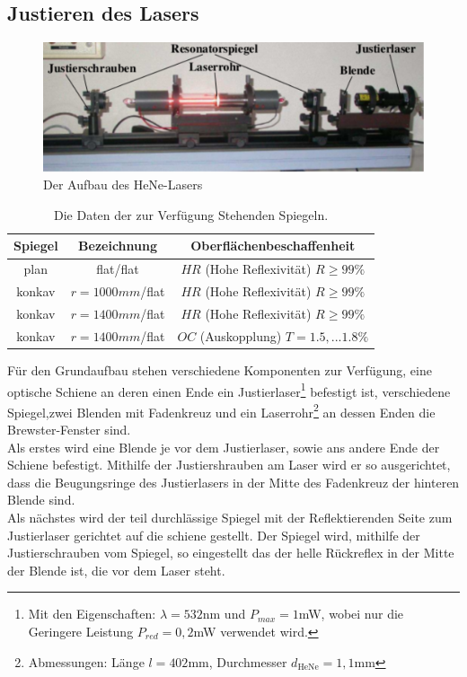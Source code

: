 \subsection{Justieren des Lasers}
\begin{figure}[h!]
\centering
\includegraphics[scale=0.75]{../Grafiken/Aufbau.pdf}
\caption{Der Aufbau des HeNe-Lasers\cite{V61}}\label{Aufbau}
\end{figure}
\begin{table}[h!]
\centering
\begin{tabular}{c c c}
Spiegel & Bezeichnung & Oberflächenbeschaffenheit \\\hline
plan & flat/flat & $HR$ (Hohe Reflexivität) $R\ge 99\%$\\
konkav & $r=1000mm$/flat & $HR$ (Hohe Reflexivität) $R\ge 99\%$\\
konkav & $r=1400mm$/flat & $HR$ (Hohe Reflexivität) $R\ge 99\%$\\
konkav & $r=1400mm$/flat & $OC$ (Auskopplung) $T=1.5,...1.8\% $
\end{tabular}
\caption{Die Daten der zur Verfügung Stehenden Spiegeln.\cite{V61}\label{Eigenschaften}}
\end{table}
Für den Grundaufbau stehen verschiedene Komponenten zur Verfügung, eine optische Schiene an deren einen Ende ein Justierlaser\footnote{Mit den Eigenschaften: $\lambda=532$nm und $P_{max}=1$mW, wobei nur die Geringere Leistung $P_{red}=0,2$mW verwendet wird.} befestigt ist, verschiedene Spiegel,zwei Blenden mit Fadenkreuz und ein Laserrohr\footnote{Abmessungen: Länge $l=402$mm, Durchmesser $d_{\text{HeNe}}=1,1$mm} an dessen Enden die Brewster-Fenster sind.\\ 
Als erstes wird eine Blende je vor dem Justierlaser, sowie ans andere Ende der Schiene befestigt. Mithilfe der Justiershrauben am Laser wird er so ausgerichtet, dass die Beugungsringe des Justierlasers in der Mitte des Fadenkreuz der hinteren Blende sind.\\
Als nächstes wird der teil durchlässige Spiegel mit der Reflektierenden Seite zum Justierlaser gerichtet auf die schiene gestellt. Der Spiegel wird, mithilfe der Justierschrauben vom Spiegel, so eingestellt das der helle Rückreflex in der Mitte der Blende ist, die vor dem Laser steht.\\ 
